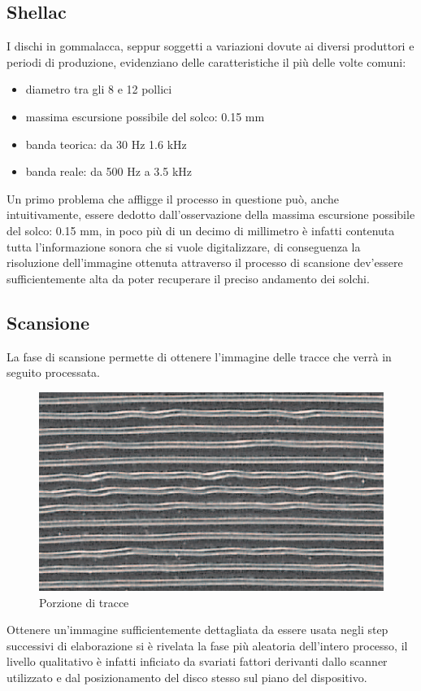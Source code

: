 \subsection{Shellac}
I dischi in gommalacca, seppur soggetti a variazioni dovute ai diversi produttori e periodi di produzione, evidenziano delle caratteristiche il pi\`u delle volte comuni:
\begin{itemize}
	\item diametro tra gli 8 e 12 pollici
	\item massima escursione possibile del solco: 0.15 mm
	\item banda teorica: da 30 Hz 1.6 kHz
	\item banda reale: da 500 Hz a 3.5 kHz
\end{itemize}
Un primo problema che affligge il processo in questione pu\`o, anche intuitivamente, essere dedotto dall'osservazione della massima escursione possibile del solco: 0.15 mm, in poco pi\`u di un decimo di millimetro \`e infatti contenuta tutta l'informazione sonora che si vuole digitalizzare, di conseguenza la risoluzione dell'immagine ottenuta attraverso il processo di scansione dev'essere sufficientemente alta da poter recuperare il preciso andamento dei solchi.

\subsection{Scansione}
La fase di scansione permette di ottenere l'immagine delle tracce che verr\`a in seguito processata.
\begin{figure}[h!t]
\begin{center}
\includegraphics[scale=0.6]{./img/shellac-track.png}
\caption{Porzione di tracce}
\end{center}
\end{figure}
Ottenere un'immagine sufficientemente dettagliata da essere usata negli step successivi di elaborazione si \`e rivelata la fase pi\`u aleatoria dell'intero processo, il livello qualitativo \`e infatti inficiato da svariati fattori derivanti dallo scanner utilizzato e dal posizionamento del disco stesso sul piano del dispositivo.

